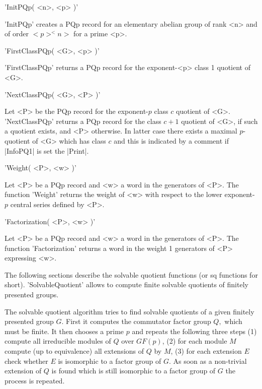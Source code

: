 
'InitPQp( <n>, <p> )'

'InitPQp' creates a  PQp record  for an elementary  abelian group of rank
<n> and of order $<p>^<n>$ for a prime <p>.


'FirstClassPQp( <G>, <p> )'

'FirstClassPQp'  returns  a PQp  record  for  the  exponent-<p>  class  1
quotient of <G>.


'NextClassPQp( <G>, <P> )'

Let <P> be the PQp record for the exponent-$p$ class $c$ quotient of <G>.
'NextClassPQp' returns a PQp record for the class  $c+1$ quotient of <G>,
if such a quotient exists, and <P> otherwise. In latter case there exists
a maximal $p$-quotient of  <G> which has class $c$ and this  is indicated
by a comment if |InfoPQ1| is set the |Print|.


'Weight( <P>, <w> )'

Let <P>  be a  PQp record and  <w> a word  in  the generators of <P>. The
function 'Weight' returns  the weight of <w> with respect  to  the  lower
exponent-$p$ central series defined by <P>.



'Factorization( <P>, <w> )'

Let  <P> be a PQp record  and <w>  a word  in the generators of <P>.  The
function 'Factorization' returns a word in the weight 1 generators of <P>
expressing <w>.


The following sections  describe the solvable  quotient functions (or  sq
functions for short).   'SolvableQuotient'    allows to  compute   finite
solvable quotients of finitely presented groups.

The solvable  quotient algorithm  tries to  find  solvable quotients of a
given finitely presented  group $G$.   First  it computes the  commutator
factor group $Q,$ which must be finite.  It then  chooses a prime $p$ and
repeats the following three steps\: (1) compute all irreducible modules of
$Q$ over $GF(p)$, (2) for each module $M$ compute (up to equivalence) all
extensions of $Q$ by $M$, (3) for each extension $E$ check whether $E$ is
isomorphic to a factor  group of $G.$ As  soon as a non-trivial extension
of $Q$ is found which  is still isomorphic to  a factor group of $G$  the
process is repeated.

